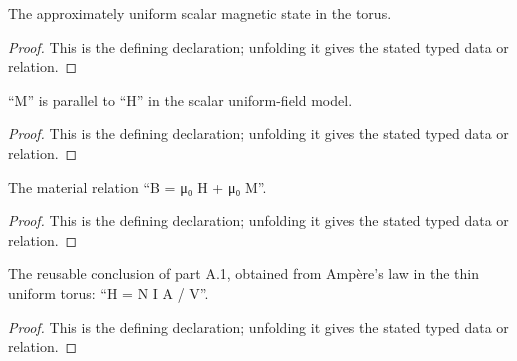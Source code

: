 \begin{definition}[UniformMagneticState]
  \label{decl:physics:IPhO_2026_3_A_2:UniformMagneticState}
  The approximately uniform scalar magnetic state in the torus.
\end{definition}
\begin{proof}
  This is the defining declaration; unfolding it gives the stated typed data or relation.
\end{proof}

\begin{definition}[IsAlignedParamagneticState]
  \label{decl:physics:IPhO_2026_3_A_2:IsAlignedParamagneticState}
  “M” is parallel to “H” in the scalar uniform-field model.
\end{definition}
\begin{proof}
  This is the defining declaration; unfolding it gives the stated typed data or relation.
\end{proof}

\begin{definition}[SatisfiesParamagneticConstitutiveLaw]
  \label{decl:physics:IPhO_2026_3_A_2:SatisfiesParamagneticConstitutiveLaw}
  The material relation “B = μ₀ H + μ₀ M”.
\end{definition}
\begin{proof}
  This is the defining declaration; unfolding it gives the stated typed data or relation.
\end{proof}

\begin{definition}[SatisfiesThinTorusAmpereLaw]
  \label{decl:physics:IPhO_2026_3_A_2:SatisfiesThinTorusAmpereLaw}
  The reusable conclusion of part A.1, obtained from Ampère's law in the thin uniform torus: “H = N I A / V”.
\end{definition}
\begin{proof}
  This is the defining declaration; unfolding it gives the stated typed data or relation.
\end{proof}

